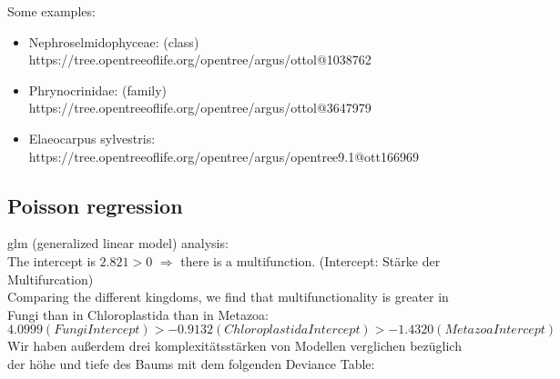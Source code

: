       Some examples:
      \begin{itemize}
        \item Nephroselmidophyceae: (class) \\
          https://tree.opentreeoflife.org/opentree/argus/ottol@1038762
        \item Phrynocrinidae: (family) \\
          https://tree.opentreeoflife.org/opentree/argus/ottol@3647979
        \item Elaeocarpus sylvestris: \\
          https://tree.opentreeoflife.org/opentree/argus/opentree9.1@ott166969
      \end{itemize}
     
      \subsection{Poisson regression}
        glm (generalized linear model) analysis: \\
      
        
        The intercept is $2.821 > 0$ $\Rightarrow$ there is a multifunction.
        (Intercept: Stärke der Multifurcation) \\
        Comparing the different kingdoms, we find that multifunctionality is greater in Fungi than in 
        Chloroplastida than in Metazoa:
        $$4.0999 (Fungi Intercept) > -0.9132 (Chloroplastida Intercept) > -1.4320 (Metazoa Intercept)$$
        Wir haben außerdem drei komplexitätsstärken von Modellen verglichen bezüglich der höhe und tiefe 
          des Baums mit dem folgenden Deviance Table:
          
